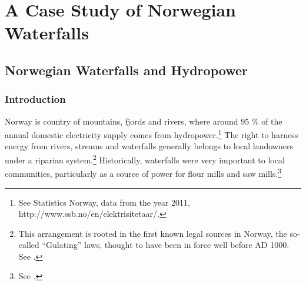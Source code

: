 \part{A Case Study of Norwegian Waterfalls}

\chapter{Norwegian Waterfalls and Hydropower}\label{chap:3}

\section{Introduction}\label{sec:into3}

Norway is country of mountains, fjords and rivers, where around 95 \% of the annual domestic electricity supply comes from hydropower.\footnote{See Statistics Norway, data from the year 2011, http://www.ssb.no/en/elektrisitetaar/.} The right to harness energy from rivers, streams and waterfalls generally belongs to local landowners under a riparian system.\footnote{This arrangement is rooted in the first known legal sources in Norway, the so-called ``Gulating'' laws, thought to have been in force well before AD 1000. See \cite[111-112,120]{robberstad81}.}  Historically, waterfalls were very important to local communities, particularly as a source of power for flour mills and saw mills.\footnote{See \cite[121]{tvedt13}.} %

